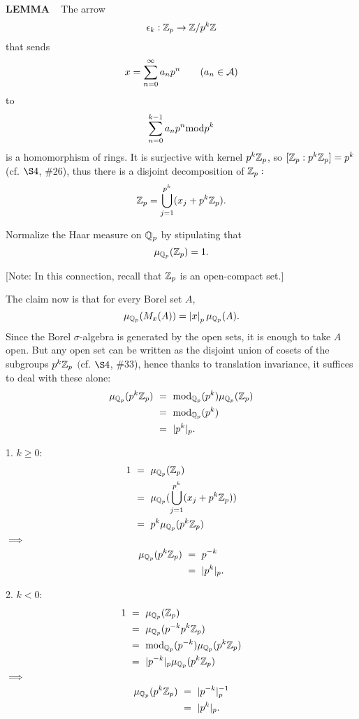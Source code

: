 \begin{x}{\small\bf LEMMA} \ %
The arrow
\[
\epsilon_k : \mathbb{Z}_p  \rightarrow \mathbb{Z}/p^k\mathbb{Z}
\]
that sends
\[
x = \sum_{n=0}^\infty a_np^n		\qquad(a_{n}  \in \mathcal{A})
\]
to
\[
\sum_{n=0}^{k-1} a_np^n \text{mod} p^k
\]
is a homomorphism of rings.  
It is surjective with kernel $p^k\mathbb{Z}_p$, so $[\mathbb{Z}_p:p^k\mathbb{Z}_p] =p^k$ 
(cf. $\S 4$,   $\#26$), thus there is a disjoint decomposition of $\mathbb{Z}_p:$
\[
\mathbb{Z}_p = \bigcup\limits_{j=1}^{p^k} (x_j + p^k\mathbb{Z}_p).
\]

Normalize the Haar measure on $\mathbb{Q}_p$ by stipulating that
\[
\mu_{\mathbb{Q}_p} (\mathbb{Z}_p) = 1.
\]

\vspace{0.1cm}

[Note: In this connection, recall that $\mathbb{Z}_p$ is an open-compact set.$]$

\vspace{0.2cm}

The claim now is that for every Borel set $A$,
\[
\mu_{\mathbb{Q}_p} (M_x(A)) = \left\vert x\right\vert_p\mu_{\mathbb{Q}_p} (A).
\]
Since the Borel $\sigma$-algebra is generated by the open sets, it is enough to take $A$ open.  
But any open set can be written as the disjoint union of cosets of the subgroups 
$p^k\mathbb{Z}_p$ $($cf. $\S 4$, $\# 33$), hence thanks to translation invariance, it suffices to deal with these alone:
\[
\begin{aligned}
\mu_{\Q_p} (p^k\Z_p) \ 
&= \ \modxs_{\Q_p}(p^k)\mu_{\Q_p}(\Z_p) \\
&= \ \modxs_{\Q_p}(p^k) \\
&= \ |p^k|_p.
\end{aligned}
\]

1. $k \ge 0$:
\[
\begin{aligned}
1  \
&= \ \mu_{\mathbb{Q}_p}(\mathbb{Z}_p)  \\
&= \ \mu_{\mathbb{Q}_p}(\bigcup\limits_{j=1}^{p^k} (x_j + p^k\mathbb{Z}_p)) \\
&= \ p^k\mu_{\mathbb{Q}_p}(p^k\mathbb{Z}_p)
\end{aligned}
\]
\qquad\qquad\qquad\qquad$\implies$
\[
\begin{aligned}
\mu_{\Q_p}(p^k\Z_p) \ 
&= \ p^{-k} \\
&= \ |p^k|_p.
\end{aligned}
\]

2. $k < 0$:
\[
\begin{aligned}
1 \ 
&=\  \mu_{\Q_p}(\Z_p) \\
&= \ \mu_{\Q_p}(p^{-k}p^k\Z_p)\\
&= \ \modxs_{\Q_p} (p^{-k}) \mu_{\Q_p} (p^k\Z_p)\\
&= \ |p^{-k}|_p \mu_{\Q_p}(p^k\Z_p)
\end{aligned}
\]
\qquad\qquad\qquad\qquad$\implies$
\[
\begin{aligned}
\mu_{\Q_p}(p^k\Z_p) \ 
&= \ |p^{-k}|_p^{-1} \\
&= \ |p^k|_p.
\end{aligned}
\]
\end{x}

